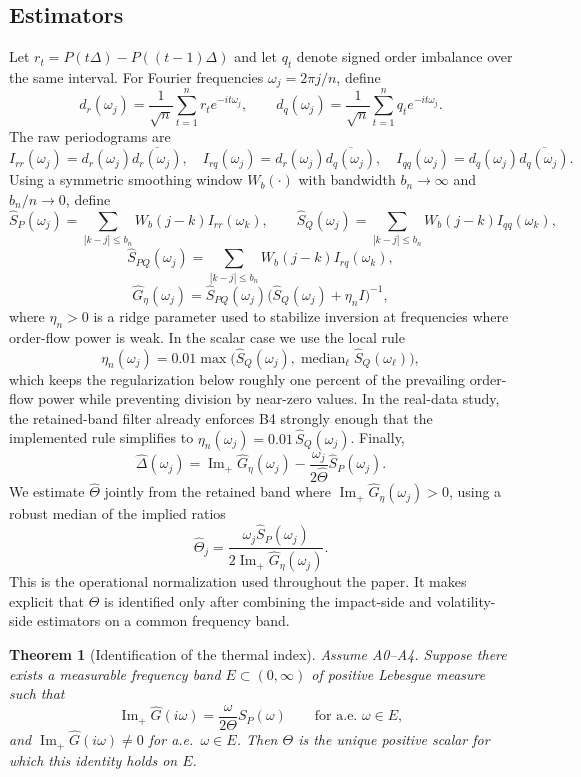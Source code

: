 \documentclass[11pt]{article}
\newtheorem{theorem}{Theorem}[section]
\newcommand{\Ghat}{\widehat{G}}
\newcommand{\ImPart}{\operatorname{Im}_{\!+}}
\newcommand{\REV}{}
\begin{document}
\subsection{Estimators}
Let $r_t=P(t\Delta)-P((t-1)\Delta)$ and let $q_t$ denote signed order imbalance over the same interval. For Fourier frequencies $\omega_j=2\pi j/n$, define
\[
  d_r(\omega_j)=\frac{1}{\sqrt{n}}\sum_{t=1}^n r_t e^{-it\omega_j},
  \qquad
  d_q(\omega_j)=\frac{1}{\sqrt{n}}\sum_{t=1}^n q_t e^{-it\omega_j}.
\]
The raw periodograms are
\[
  I_{rr}(\omega_j)=d_r(\omega_j)\overline{d_r(\omega_j)},
  \quad
  I_{rq}(\omega_j)=d_r(\omega_j)\overline{d_q(\omega_j)},
  \quad
  I_{qq}(\omega_j)=d_q(\omega_j)\overline{d_q(\omega_j)}.
\]
Using a symmetric smoothing window $W_b(\cdot)$ with bandwidth $b_n\to\infty$ and $b_n/n\to 0$, define
\[
  \widehat{S}_P(\omega_j)=\sum_{|k-j|\le b_n}W_b(j-k)I_{rr}(\omega_k),
  \qquad
  \widehat{S}_Q(\omega_j)=\sum_{|k-j|\le b_n}W_b(j-k)I_{qq}(\omega_k),
\]
\[
  \widehat{S}_{PQ}(\omega_j)=\sum_{|k-j|\le b_n}W_b(j-k)I_{rq}(\omega_k),
\]
\[
  \widehat{G}_\eta(\omega_j)=\widehat{S}_{PQ}(\omega_j)\big(\widehat{S}_Q(\omega_j)+\eta_n I\big)^{-1},
\]
where $\eta_n>0$ is a ridge parameter used to stabilize inversion at frequencies where order-flow power is weak. In the scalar case we use the local rule
\[
  \eta_n(\omega_j)=0.01\max\!\big(\widehat{S}_Q(\omega_j), \operatorname{median}_{\ell}\widehat{S}_Q(\omega_\ell)\big),
\]
which keeps the regularization below roughly one percent of the prevailing order-flow power while preventing division by near-zero values. In the real-data study, the retained-band filter already enforces B4 strongly enough that the implemented rule simplifies to $\eta_n(\omega_j)=0.01\,\widehat S_Q(\omega_j)$.
Finally,
\[
  \widehat{\Delta}(\omega_j)=\ImPart \widehat{G}_\eta(\omega_j)-\frac{\omega_j}{2\widehat{\Theta}}\widehat{S}_P(\omega_j).
\]
We estimate $\widehat{\Theta}$ jointly from the retained band where $\ImPart \widehat{G}_\eta(\omega_j)>0$, using a robust median of the implied ratios
\[
  \widehat{\Theta}_j=\frac{\omega_j\widehat{S}_P(\omega_j)}{2\ImPart \widehat{G}_\eta(\omega_j)}.
\]
This is the operational normalization used throughout the paper. It makes explicit that $\Theta$ is identified only after combining the impact-side and volatility-side estimators on a common frequency band.

\begin{theorem}[Identification of the thermal index]\label{thm:theta-identification}\REV
Assume A0--A4. Suppose there exists a measurable frequency band $E\subset(0,\infty)$ of positive Lebesgue measure such that
\[
  \ImPart \Ghat(i\omega)=\frac{\omega}{2\Theta}S_P(\omega)
  \qquad \text{for a.e.\ }\omega\in E,
\]
and $\ImPart \Ghat(i\omega)\neq 0$ for a.e.\ $\omega\in E$. Then $\Theta$ is the unique positive scalar for which this identity holds on $E$.
\end{theorem}
\end{document}
